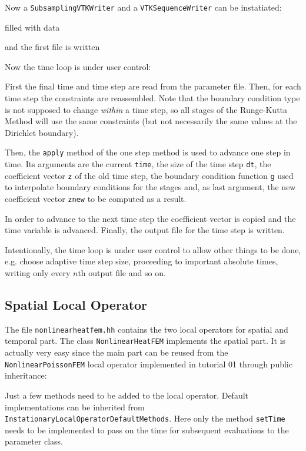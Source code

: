 \documentclass[a4paper,12pt]{article}
\begin{document}
Now a \lstinline{SubsamplingVTKWriter} and a \lstinline{VTKSequenceWriter}
can be instatiated:

filled with data

and the first file is written


Now the time loop is under user control:

First the final time and time step are read from the parameter
file. Then, for each time step the constraints are reassembled. Note that
the boundary condition type is not supposed to
change \textit{within} a time step, so all stages of the Runge-Kutta Method
will use the same constraints (but not necessarily the same values at the
Dirichlet boundary).

Then, the \lstinline{apply} method of the one step method is used to
advance one step in time. Its arguments are the current \lstinline{time}, the
size of the time step \lstinline{dt}, the coefficient vector \lstinline{z} of the old
time step, the boundary condition function \lstinline{g} used to interpolate 
boundary conditions for the stages and, as last argument, the new coefficient
vector \lstinline{znew} to be computed as a result.

In order to advance to the next time step the coefficient vector is copied and the
time variable is advanced. Finally, the output file for the time step is written.

Intentionally, the time loop is under user control to allow other things to be done,
e.g. choose adaptive time step size, proceeding to important absolute times,
writing only  every $n$th output file and so on.

\subsection{Spatial Local Operator}

The file \lstinline{nonlinearheatfem.hh} contains the two local operators
for spatial and temporal part. The class \lstinline{NonlinearHeatFEM} implements the
spatial part. It is actually very easy since the main part can be reused
from the \lstinline{NonlinearPoissonFEM} local operator  implemented in tutorial 01 through
public inheritance:

Just a few methods need to be added to the local operator. 
Default implementations can be inherited from 
\lstinline{InstationaryLocalOperatorDefaultMethods}. Here only the method
\lstinline{setTime} needs to be implemented to pass on the time
for subsequent evaluations to the parameter class.
\end{document}

